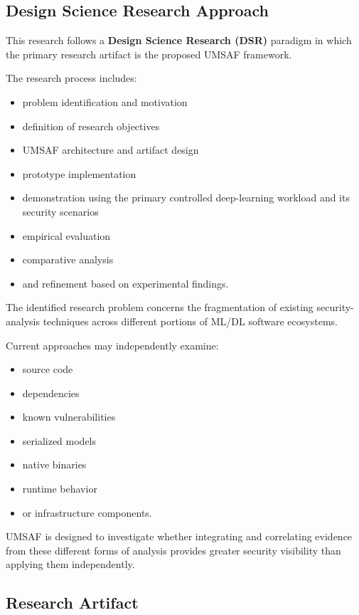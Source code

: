 \documentclass[
  12pt,
  letterpaper,
  oneside]{report}
\providecommand{\tightlist}{%
  \setlength{\itemsep}{0pt}\setlength{\parskip}{0pt}}
\begin{document}
\subsection{Design Science Research Approach}\label{1121-design-science-research-approach}

This research follows a \textbf{Design Science Research (DSR)} paradigm
in which the primary research artifact is the proposed UMSAF framework.

The research process includes:

\begin{itemize}
\tightlist
\item
  problem identification and motivation
\item
  definition of research objectives
\item
  UMSAF architecture and artifact design
\item
  prototype implementation
\item
  demonstration using the primary controlled deep-learning workload and
  its security scenarios
\item
  empirical evaluation
\item
  comparative analysis
\item
  and refinement based on experimental findings.
\end{itemize}

The identified research problem concerns the fragmentation of existing
security-analysis techniques across different portions of ML/DL software
ecosystems.

Current approaches may independently examine:

\begin{itemize}
\tightlist
\item
  source code
\item
  dependencies
\item
  known vulnerabilities
\item
  serialized models
\item
  native binaries
\item
  runtime behavior
\item
  or infrastructure components.
\end{itemize}

UMSAF is designed to investigate whether integrating and correlating
evidence from these different forms of analysis provides greater
security visibility than applying them independently.

\subsection{Research Artifact}\label{1122-research-artifact}
\end{document}
